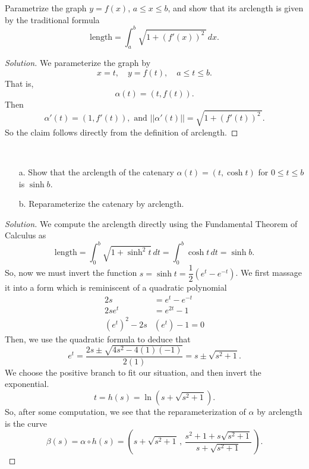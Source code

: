 \documentclass[Shifrin_Solutions_Spring_2018]{subfiles}
\begin{document}



\begin{exercise}
Parametrize the graph $y=f(x)$, $a\leq x \leq b$, and show that its arclength is given by the traditional formula
\[
\mbox{length} = \int_a^b \sqrt{1+(f'(x))^2\,}\, dx .
\]
\end{exercise}

\begin{proof}[Solution]
We parameterize the graph by
\[
x = t, \quad y = f(t), \quad a \leq t \leq b .
\]
That is,
\[
\alpha(t) = \left( t, f(t) \right).
\]
Then
\[
\alpha'(t) = \left( 1, f'(t) \right), \mbox{ and } ||\alpha'(t)|| = \sqrt{1 + (f'(t))^2\,} .
\]
So the claim follows directly from the definition of arclength.
\end{proof}




\begin{exercise}{$\ $}
\begin{itemize}
\item[a.] Show that the arclength of the catenary $\alpha(t) = (t, \cosh t)$ for $0\leq t\leq b$ is $\sinh b$.

\item[b.] Reparameterize the catenary by arclength.
\end{itemize}
\end{exercise}

\begin{proof}[Solution]
We compute the arclength directly using the Fundamental Theorem of Calculus as
\[
\text{length} = \int_0^b \sqrt{1 + \sinh^2 t } \, dt = \int_0^b \cosh t \, dt = \sinh b .
\]
So, now we must invert the function $s = \sinh t = \dfrac{1}{2} \left( e^t - e^{-t}\right)$. We first massage it into a form which is reminiscent of a quadratic polynomial
\begin{align*}
2s & = e^t - e^{-t} \\
2se^t &= e^{2t} - 1 \\
(e^t)^2  - 2 s& (e^t) - 1 = 0
\end{align*}
Then, we use the quadratic formula to deduce that
\[
e^t  = \dfrac{2s \pm \sqrt{4s^2 - 4(1)(-1)} }{2(1)} = s \pm \sqrt{s^2+1} .
\]
We choose the positive branch to fit our situation, and then invert the exponential.
\[ t = h(s) = \ln(  s + \sqrt{s^2+1} ) . \]
So, after some computation, we see that the reparameterization of $\alpha$ by arclength is the curve
\[
\beta(s) = \alpha\circ h(s) = \left(  s + \sqrt{s^2+1}\, , \,
\dfrac{s^2+1 + s\sqrt{s^2+1 } }{ s + \sqrt{s^2+1 } }\, \right).
\]
\end{proof}
\end{document}
